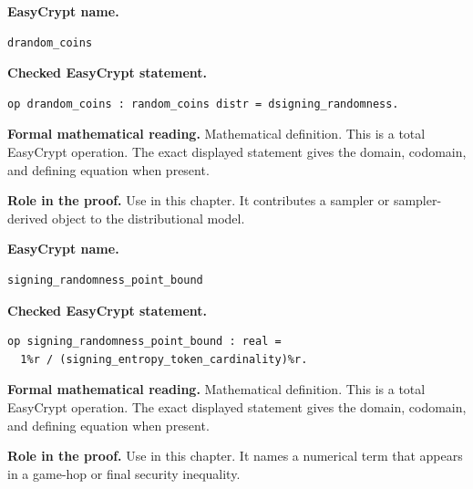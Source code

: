 \begin{formaldefinition}
\noindent\textbf{EasyCrypt name.}
\begin{lstlisting}[language=EasyCrypt,basicstyle=\ttfamily\scriptsize]
drandom_coins
\end{lstlisting}
\noindent\textbf{Checked EasyCrypt statement.}
\begin{lstlisting}[language=EasyCrypt,basicstyle=\ttfamily\scriptsize]
op drandom_coins : random_coins distr = dsigning_randomness.
\end{lstlisting}
\noindent\textbf{Formal mathematical reading.}
Mathematical definition. This is a total EasyCrypt operation.  The exact displayed statement gives the domain, codomain, and defining equation when present.

\noindent\textbf{Role in the proof.}
Use in this chapter. It contributes a sampler or sampler-derived object to the distributional model.

\end{formaldefinition}

\begin{formaldefinition}
\noindent\textbf{EasyCrypt name.}
\begin{lstlisting}[language=EasyCrypt,basicstyle=\ttfamily\scriptsize]
signing_randomness_point_bound
\end{lstlisting}
\noindent\textbf{Checked EasyCrypt statement.}
\begin{lstlisting}[language=EasyCrypt,basicstyle=\ttfamily\scriptsize]
op signing_randomness_point_bound : real =
  1%r / (signing_entropy_token_cardinality)%r.
\end{lstlisting}
\noindent\textbf{Formal mathematical reading.}
Mathematical definition. This is a total EasyCrypt operation.  The exact displayed statement gives the domain, codomain, and defining equation when present.

\noindent\textbf{Role in the proof.}
Use in this chapter. It names a numerical term that appears in a game-hop or final security inequality.

\end{formaldefinition}

